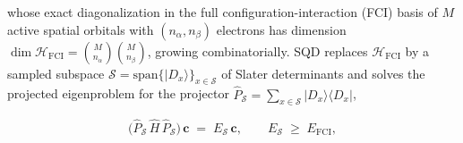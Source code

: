 \documentclass[onecolumn,a4paper]{quantumarticle}
\begin{document}
whose exact diagonalization in the full configuration-interaction (FCI) basis of $M$ active spatial orbitals with $(n_\alpha,n_\beta)$ electrons has dimension $\dim\mathcal H_{\mathrm{FCI}} = \binom{M}{n_\alpha}\binom{M}{n_\beta}$, growing combinatorially. SQD replaces $\mathcal H_{\mathrm{FCI}}$ by a sampled subspace $\mathcal S = \mathrm{span}\{|D_x\rangle\}_{x\in\mathcal S}$ of Slater determinants and solves the projected eigenproblem for the projector $\hat P_{\mathcal S}=\sum_{x\in\mathcal S}|D_x\rangle\langle D_x|$,

\begin{equation}
\big(\hat P_{\mathcal S}\,\hat H\,\hat P_{\mathcal S}\big)\,\mathbf c \;=\; E_{\mathcal S}\,\mathbf c, \qquad E_{\mathcal S} \;\ge\; E_{\mathrm{FCI}},
\end{equation}
\end{document}
